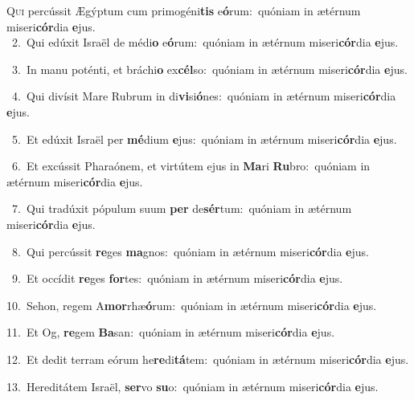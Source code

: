 \lettrine{\initial\textcolor{\initialcolor}{Q}}{ui} percússit Ægýptum cum primogéni\textbf{tis} e\-\textbf{ó}\-rum:~\star quóniam in ætérnum miseri\-\textbf{cór}\-dia \textbf{e}\-jus.\\
{\numbfont\textcolor{\numbcolor}{~2.}}~Qui edúxit Israël de médi\textbf{o} e\-\textbf{ó}\-rum:~\star quóniam in ætérnum miseri\-\textbf{cór}\-dia \textbf{e}\-jus.\par
{\numbfont\textcolor{\numbcolor}{~3.}}~In manu poténti, et bráchi\textbf{o} ex\-\textbf{cél}\-so:~\star quóniam in ætérnum miseri\-\textbf{cór}\-dia \textbf{e}\-jus.\par
{\numbfont\textcolor{\numbcolor}{~4.}}~Qui divísit Mare Rubrum in di\-\textbf{vi}\-si\-\textbf{ó}\-nes:~\star quóniam in ætérnum miseri\-\textbf{cór}\-dia \textbf{e}\-jus.\par
{\numbfont\textcolor{\numbcolor}{~5.}}~Et edúxit Israël per \textbf{mé}\-dium \textbf{e}\-jus:~\star quóniam in ætérnum miseri\-\textbf{cór}\-dia \textbf{e}\-jus.\par
{\numbfont\textcolor{\numbcolor}{~6.}}~Et excússit Pharaónem, et virtútem ejus in \textbf{Ma}\-ri \textbf{Ru}\-bro:~\star quóniam in ætérnum miseri\-\textbf{cór}\-dia \textbf{e}\-jus.\par
{\numbfont\textcolor{\numbcolor}{~7.}}~Qui tradúxit pópulum suum \textbf{per} de\-\textbf{sér}\-tum:~\star quóniam in ætérnum miseri\-\textbf{cór}\-dia \textbf{e}\-jus.\par
{\numbfont\textcolor{\numbcolor}{~8.}}~Qui percússit \textbf{re}\-ges \textbf{ma}\-gnos:~\star quóniam in ætérnum miseri\-\textbf{cór}\-dia \textbf{e}\-jus.\par
{\numbfont\textcolor{\numbcolor}{~9.}}~Et occídit \textbf{re}\-ges \textbf{for}\-tes:~\star quóniam in ætérnum miseri\-\textbf{cór}\-dia \textbf{e}\-jus.\par
{\numbfont\textcolor{\numbcolor}{10.}}~Sehon, regem A\-\textbf{mor}\-rhæ\-\textbf{ó}\-rum:~\star quóniam in ætérnum miseri\-\textbf{cór}\-dia \textbf{e}\-jus.\par
{\numbfont\textcolor{\numbcolor}{11.}}~Et Og, \textbf{re}\-gem \textbf{Ba}\-san:~\star quóniam in ætérnum miseri\-\textbf{cór}\-dia \textbf{e}\-jus.\par
{\numbfont\textcolor{\numbcolor}{12.}}~Et dedit terram eórum he\-\textbf{re}\-di\-\textbf{tá}\-tem:~\star quóniam in ætérnum miseri\-\textbf{cór}\-dia \textbf{e}\-jus.\par
{\numbfont\textcolor{\numbcolor}{13.}}~Hereditátem Israël, \textbf{ser}\-vo \textbf{su}\-o:~\star quóniam in ætérnum miseri\-\textbf{cór}\-dia \textbf{e}\-jus.\par
